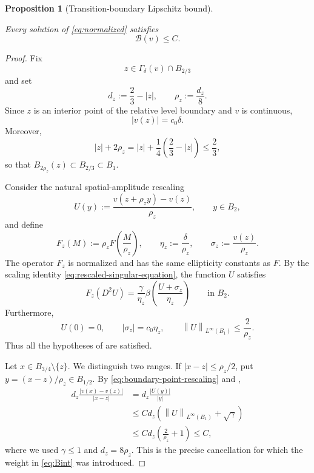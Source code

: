 \documentclass[11pt,letterpaper]{amsart}
\numberwithin{equation}{section}
\newcommand{\norm}[1]{\left\lVert #1\right\rVert}
\newtheorem{proposition}[theorem]{Proposition}
\theoremstyle{definition}
\theoremstyle{remark}
\begin{document}
\begin{proposition}[Transition-boundary Lipschitz bound]
\label{prop:Bbound}

Every solution of \eqref{eq:normalized} satisfies
\begin{equation}\label{eq:Bbound}
\mathcal B(v)\leq C.
\end{equation}
\end{proposition}

\begin{proof}
Fix
$$
z\in\Gamma_\delta(v)\cap B_{2/3}
$$
and set
\begin{equation}\label{eq:boundary-distance-scale}
d_z:=\frac23-|z|,
\qquad
\rho_z:=\frac{d_z}{8}.
\end{equation}
Since $z$ is an interior point of the relative level boundary and $v$ is
continuous,
\begin{equation}\label{eq:level-boundary-value}
|v(z)|=c_0\delta.
\end{equation}
Moreover,
$$
|z|+2\rho_z
=
|z|+\frac14\left(\frac23-|z|\right)
\leq\frac23,
$$
so that $B_{2\rho_z}(z)\subset B_{2/3}\subset B_1$.

Consider the natural spatial-amplitude rescaling
\begin{equation}\label{eq:boundary-point-rescaling}
U(y)
:=
\frac{v(z+\rho_zy)-v(z)}{\rho_z},
\qquad y\in B_2,
\end{equation}
and define
$$
F_z(M)
:=
\rho_zF\left(\frac{M}{\rho_z}\right),
\qquad
\eta_z:=\frac{\delta}{\rho_z},
\qquad
\sigma_z:=\frac{v(z)}{\rho_z}.
$$
The operator $F_z$ is normalized and has the same ellipticity constants as
$F$. By the scaling identity \eqref{eq:rescaled-singular-equation}, the
function $U$ satisfies
\begin{equation}\label{eq:boundary-point-equation}
F_z(D^2U)
=
\frac{\gamma}{\eta_z}
\beta\left(\frac{U+\sigma_z}{\eta_z}\right)
\qquad\text{in }B_2.
\end{equation}
Furthermore,
$$
U(0)=0,
\qquad
|\sigma_z|=c_0\eta_z,
\qquad
\norm{U}_{L^\infty(B_1)}
\leq
\frac{2}{\rho_z}.
$$
Thus all the hypotheses of  are satisfied.

Let $x\in B_{3/4}\setminus\{z\}$. We distinguish two ranges. If
$|x-z|\leq\rho_z/2$, put $y=(x-z)/\rho_z\in B_{1/2}$. By
\eqref{eq:boundary-point-rescaling} and ,
\begin{align*}
d_z\frac{|v(x)-v(z)|}{|x-z|}
&=
d_z\frac{|U(y)|}{|y|}
\\
&\leq
Cd_z\left(
\norm{U}_{L^\infty(B_1)}+\sqrt\gamma
\right)
\\
&\leq
Cd_z\left(\frac2{\rho_z}+1\right)
\leq C,
\end{align*}
where we used $\gamma\leq1$ and $d_z=8\rho_z$. This is the precise
cancellation for which the weight in \eqref{eq:Bint} was introduced.


\end{proof}
\end{document}
